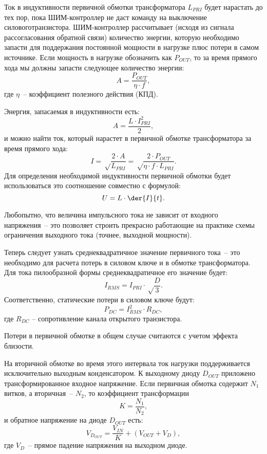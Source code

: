 Ток в индуктивности первичной обмотки трансформатора \( L_{PRI} \) будет
нарастать до тех пор, пока ШИМ-контроллер не даст команду на выключение силовоготранзистора. ШИМ-контроллер рассчитывает (исходя из сигнала рассогласования
обратной связи) количество энергии, которую необходимо запасти для поддержания
постоянной мощности в нагрузке плюс потери в самом источнике. Если мощность в
нагрузке обозначить как \( P_{OUT} \), то за время прямого хода мы должны
запасти следующее количество энергии:
\begin{equation}
    A = \frac{P_{OUT}}{\eta\cdot f},
\end{equation}
где \( \eta \)~-- коэффициент полезного действия (КПД).

Энергия, запасаемая в индуктивности есть:
\begin{equation}
    A = \frac{L\cdot I_{PRI}^2}{2},
\end{equation}
и можно найти ток, который нарастет в первичной обмотке трансформатора за время
прямого хода:
\begin{equation}
I = \sqrt\frac{2\cdot A}{L_{PRI}} = \sqrt\frac{2\cdot P_{OUT}}{\eta\cdot f\cdot
L_{PRI}}.
\end{equation}
Для определения необходимой индуктивности первичной обмотки будет использоваться
это соотношение совместно с формулой:
\begin{equation}
    U = L\cdot\der{I}{t}.
\end{equation}

Любопытно, что величина импульсного тока не зависит от входного напряжения~--
это позволяет строить прекрасно работающие на практике схемы ограничения
выходного тока (точнее, выходной мощности).

Теперь следует узнать среднеквадратичное значение первичного тока~-- это
необходимо для расчета потерь в силовом ключе и в обмотке трансформатора. Для
тока пилообразной формы среднеквадратичное его значение будет: 
\begin{equation}
    I_{RMS} = I_{PRI}\cdot\sqrt\frac{D}{3}.
\end{equation}
Соответственно, статические потери в силовом ключе будут:
\begin{equation}
    P_{DC} = I_{RMS}^2\cdot R_{DC},
\end{equation}
где \( R_{DC} \) -- сопротивление канала открытого транзистора.

Потери в первичной обмотке в общем случае считаются с учетом эффекта близости.

На вторичной обмотке во время этого интервала ток нагрузки поддерживается
исключительно выходным конденсатором. К выходному диоду \( D_{OUT} \) приложено
трансформированное входное напряжение. Если первичная обмотка содержит \( N_1 \)
витков, а вторичная~-- \( N_2 \), то коэффициент трансформации
\begin{equation}
    K = \frac{N_1}{N_2},
\end{equation}
и обратное напряжение на диоде \( D_{OUT} \) есть:
\begin{equation}
    V_{D_{OUT}} = \frac{V_{IN}}{K} + (V_{OUT} + V_D),
\end{equation}
где \( V_D \)~-- прямое падение напряжения на выходном диоде.


